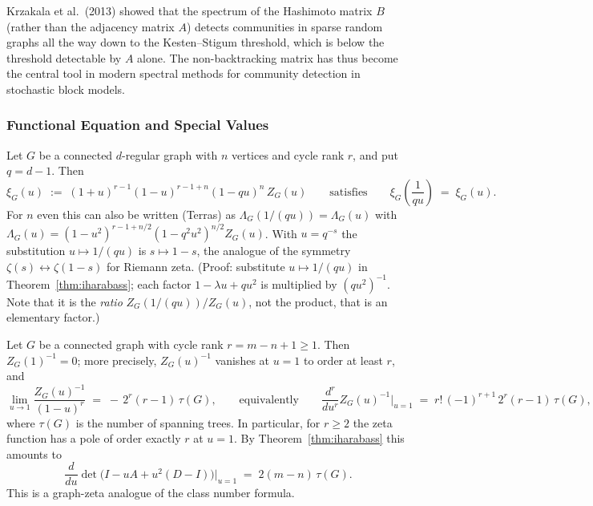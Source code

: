 \begin{remark}
Krzakala et al.\ (2013) showed that the spectrum of the Hashimoto
matrix $B$ (rather than the adjacency matrix $A$) detects communities
in sparse random graphs all the way down to the Kesten--Stigum
threshold, which is below the threshold detectable by $A$ alone. The
non-backtracking matrix has thus become the central tool in modern
spectral methods for community detection in stochastic block models.
\end{remark}

\subsubsection{Functional Equation and Special Values}

\begin{theorem}
Let $G$ be a connected $d$-regular graph with $n$ vertices and cycle
rank $r$, and put $q = d - 1$. Then
\[
  \xi_G(u) \;:=\; (1 + u)^{r - 1} (1 - u)^{r - 1 + n} (1 - q u)^{n}\, Z_G(u)
  \qquad\text{satisfies}\qquad
  \xi_G\!\left(\frac{1}{q u}\right) \;=\; \xi_G(u).
\]
For $n$ even this can also be written (Terras) as
$\Lambda_G(1/(qu)) = \Lambda_G(u)$ with
$\Lambda_G(u) = (1 - u^2)^{r - 1 + n/2}(1 - q^2 u^2)^{n/2} Z_G(u)$.
With $u = q^{-s}$ the substitution $u \mapsto 1/(qu)$ is
$s \mapsto 1 - s$, the analogue of the symmetry
$\zeta(s) \leftrightarrow \zeta(1 - s)$ for Riemann zeta. (Proof:
substitute $u \mapsto 1/(qu)$ in Theorem~\ref{thm:iharabass}; each
factor $1 - \lambda u + q u^2$ is multiplied by $(q u^2)^{-1}$. Note that
it is the \emph{ratio} $Z_G(1/(qu))/Z_G(u)$, not the product, that is
an elementary factor.)
\end{theorem}

\begin{theorem}[The pole at $u = 1$; Hashimoto, Northshield]
Let $G$ be a connected graph with cycle rank $r = m - n + 1 \ge 1$.
Then $Z_G(1)^{-1} = 0$; more precisely, $Z_G(u)^{-1}$ vanishes at
$u = 1$ to order at least $r$, and
\[
  \lim_{u \to 1} \frac{Z_G(u)^{-1}}{(1 - u)^{r}} \;=\; -\,2^{r} (r - 1)\, \tau(G),
  \qquad\text{equivalently}\qquad
  \frac{d^r}{du^r} Z_G(u)^{-1} \Big|_{u = 1} \;=\; r!\,(-1)^{r+1}\, 2^{r} (r - 1)\, \tau(G),
\]
where $\tau(G)$ is the number of spanning trees. In particular, for
$r \ge 2$ the zeta function has a pole of order exactly $r$ at
$u = 1$. By Theorem~\ref{thm:iharabass} this amounts to
\[
  \frac{d}{du}\det\!\big(I - uA + u^2(D - I)\big)\Big|_{u = 1} \;=\; 2(m - n)\,\tau(G).
\]
This is a graph-zeta analogue of the class number formula.
\end{theorem}

